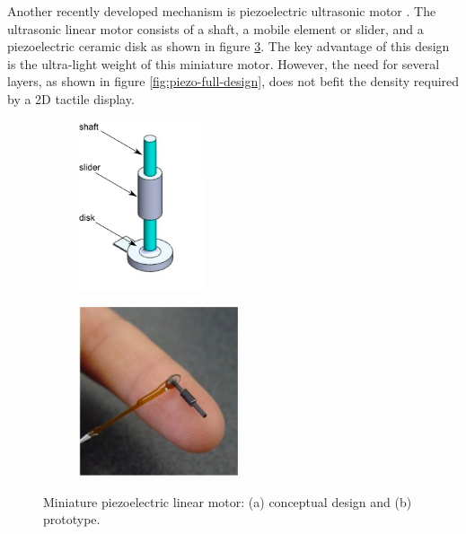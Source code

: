 Another recently developed mechanism is piezoelectric ultrasonic motor \cite{hernandez_characterization_2009}.
The ultrasonic linear motor consists of a shaft, a mobile element or slider, and a piezoelectric ceramic disk as shown in figure \ref{fig:piezo-miniature}.
The key advantage of this design is the ultra-light weight of this miniature motor.
However, the need for several layers, as shown in figure \ref{fig:piezo-full-design}, does not befit the density required by a 2D tactile display.

\begin{figure}[h] \centering
    \begin{subfigure}[b]{0.45\textwidth}\centering
        \includegraphics[height=5cm]{figures/piezo-miniature-a.png}
        \caption{}
        \label{fig:piezo-miniature-a}
    \end{subfigure}
    \begin{subfigure}[b]{0.45\textwidth}\centering
        \includegraphics[height=5cm]{figures/piezo-miniature-b.png}
        \caption{}
        \label{fig:piezo-miniature-b}
    \end{subfigure}
\caption[Miniature piezoelectric linear motor]{Miniature piezoelectric linear motor: (a) conceptual design and (b) prototype.}
\label{fig:piezo-miniature}
\end{figure}

